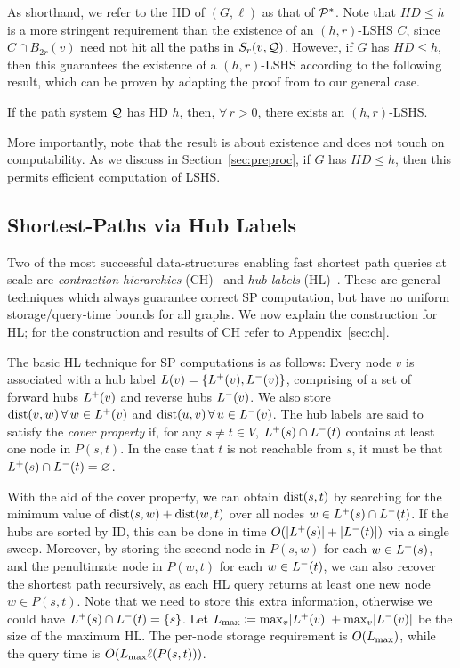\documentclass[opre,nonblindrev]{informs3} %
\begin{document}
As shorthand, we refer to the HD of $(G,\ell)$ as that of $\PS$. 
Note that $HD\leq h$ is a more stringent requirement than the existence of an $(h,r)$-LSHS $C$, since $C\cap B_{2r}(v)$ need not hit all the paths in $S_r(v,\calQ)$. 
However, if $G$ has $HD \leq h$, then this guarantees the existence of a $(h,r)$-LSHS according to the following result, which can be proven by adapting the proof from \cite[Theorem 4.2]{highway2013} to our general case.
\begin{proposition}\label{prop:equiv}
If the path system $\calQ$ has HD $h$, then, $\forall\,r>0$, there exists an $(h,r)$-LSHS.
\end{proposition}

More importantly, note that the result is about existence and does not touch on computability.
As we discuss in Section~\ref{sec:preproc}, if $G$ has $HD \leq h$, then this permits efficient computation of LSHS.

\subsection{Shortest-Paths via Hub Labels}
\label{ssec:hldef}
Two of the most successful data-structures enabling fast shortest path queries at scale are \emph{contraction hierarchies} (CH)~\cite{geisberger_ch_definition} and \emph{hub labels} (HL)~\cite{cohen_definition_hl}.
These are general techniques which always guarantee correct SP computation, but have no uniform storage/query-time bounds for all graphs. 
We now explain the construction for HL; for the construction and results of CH refer to Appendix~\ref{sec:ch}.

The basic HL technique for SP computations is as follows:
Every node $v$ is associated with a hub label $L(v) = \crl*{\Lf(v),\Lb(v)}$, comprising of a set of forward hubs $\Lf(v)$ and reverse hubs $\Lb(v)$.
We also store $\dist(v,w) \,\forall\, w\in\Lf(v)$ and $\dist(u,v)\,\forall\,u\in\Lb(v)$.
The hub labels are said to satisfy the \emph{cover property} if, for any $s\neq t\in V$, $\Lf(s)\cap\Lb(t)$ contains at least one node in $P(s,t)$.
In the case that $t$ is not reachable from $s$, it must be that $\Lf(s)\cap\Lb(t)=\varnothing$.

With the aid of the cover property, we can obtain $\dist(s,t)$ by searching for the minimum value of $\dist(s,w)+\dist(w,t)$ over all nodes $w\in\Lf(s)\cap\Lb(t)$.
If the hubs are sorted by ID, this can be done in time $\Or(\card{\Lf(s)}+\card{\Lb(t)})$ via a single sweep.
Moreover, by storing the second node in $P(s,w)$ for each $w\in \Lf(s)$, and the penultimate node in $P(w,t)$ for each $w\in \Lb(t)$, we can also recover the shortest path recursively, as each HL query returns at least one new node $w\in P(s,t)$.
Note that we need to store this extra information, otherwise we could have $\Lf(s)\cap\Lb(t)=\crl{s}$.
Let $\Lm \defeq \max_v\abs*{\Lf(v)}+\max_v\abs*{\Lb(v)}$ be the size of the maximum HL.
The per-node storage requirement is $\Or(\Lm)$, while the query time is $\Or(\Lm\ell(P(s,t)))$.
\end{document}
